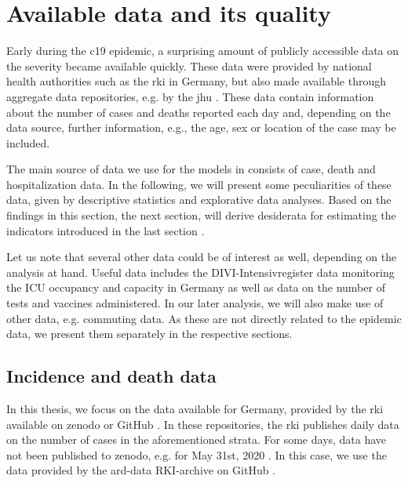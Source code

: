 \section{Available data and its quality}
\label{sec:data}

Early during the \acrshort{c19} epidemic, a surprising amount of publicly accessible data on the severity became available quickly. These data were provided by national health authorities such as the \acrfull{rki} in Germany, but also made available through aggregate data repositories, e.g. by the \acrfull{jhu} \citep{Dong2020Interactive}. These data contain information about the number of cases and deaths reported each day and, depending on the data source, further information, e.g., the age, sex or location of the case may be included. 

The main source of data we use for the models in  consists of case, death and hospitalization data. In the following, we will present some peculiarities of these data, given by descriptive statistics and explorative data analyses. Based on the findings in this section, the next section,  will derive desiderata for estimating the indicators introduced in the last section .

Let us note that several other data could be of interest as well, depending on the analysis at hand. Useful data includes the DIVI-Intensivregister data monitoring the ICU occupancy and capacity in Germany as well as data on the number of tests and vaccines administered. In our later analysis, we will also make use of other data, e.g. commuting data. As these are not directly related to the epidemic data, we present them separately in the respective sections.

\subsection{Incidence and death data}
In this thesis, we focus on the data available for Germany, provided by the \acrshort{rki} available on zenodo \citep{RobertKoch-Institut2024SARSCoV2} or GitHub \citep{RobertKoch-Institut2024SARSCoV2a}. In these repositories, the \acrshort{rki} publishes daily data on the number of cases in the aforementioned strata. For some days, data have not been published to zenodo, e.g. for May 31st, 2020 . In this case, we use the data provided by the ard-data RKI-archive on GitHub \citep{MichaelKreil2022RKICoronaDatenArchiv}. 


